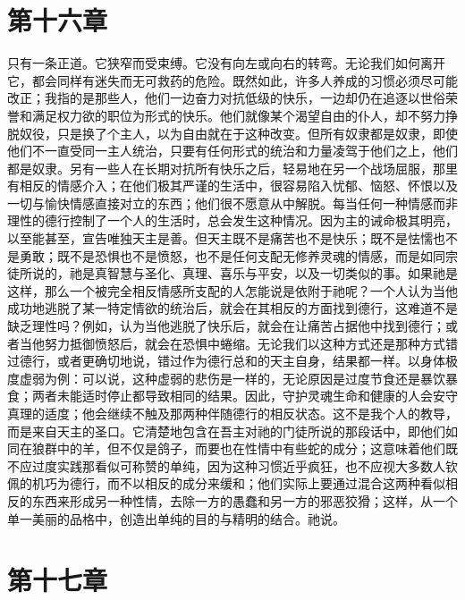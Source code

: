 
\section{第十六章}

只有一条正道。它狭窄而受束缚。它没有向左或向右的转弯。无论我们如何离开它，都会同样有迷失而无可救药的危险。既然如此，许多人养成的习惯必须尽可能改正；我指的是那些人，他们一边奋力对抗低级的快乐，一边却仍在追逐以世俗荣誉和满足权力欲的职位为形式的快乐。他们就像某个渴望自由的仆人，却不努力挣脱奴役，只是换了个主人，以为自由就在于这种改变。但所有奴隶都是奴隶，即使他们不一直受同一主人统治，只要有任何形式的统治和力量凌驾于他们之上，他们都是奴隶。另有一些人在长期对抗所有快乐之后，轻易地在另一个战场屈服，那里有相反的情感介入；在他们极其严谨的生活中，很容易陷入忧郁、恼怒、怀恨以及一切与愉快情感直接对立的东西；他们很不愿意从中解脱。每当任何一种情感而非理性的德行控制了一个人的生活时，总会发生这种情况。因为主的诫命极其明亮，以至能甚至，宣告唯独天主是善。但天主既不是痛苦也不是快乐；既不是怯懦也不是勇敢；既不是恐惧也不是愤怒，也不是任何支配无修养灵魂的情感，而是如同宗徒所说的，祂是真智慧与圣化、真理、喜乐与平安，以及一切类似的事。如果祂是这样，那么一个被完全相反情感所支配的人怎能说是依附于祂呢？一个人认为当他成功地逃脱了某一特定情欲的统治后，就会在其相反的方面找到德行，这难道不是缺乏理性吗？例如，认为当他逃脱了快乐后，就会在让痛苦占据他中找到德行；或者当他努力抵御愤怒后，就会在恐惧中蜷缩。无论我们以这种方式还是那种方式错过德行，或者更确切地说，错过作为德行总和的天主自身，结果都一样。以身体极度虚弱为例：可以说，这种虚弱的悲伤是一样的，无论原因是过度节食还是暴饮暴食；两者未能适时停止都导致相同的结果。因此，守护灵魂生命和健康的人会安守真理的适度；他会继续不触及那两种伴随德行的相反状态。这不是我个人的教导，而是来自天主的圣口。它清楚地包含在吾主对祂的门徒所说的那段话中，即他们如同在狼群中的羊，但不仅是鸽子，而要也在性情中有些蛇的成分；这意味着他们既不应过度实践那看似可称赞的单纯，因为这种习惯近乎疯狂，也不应视大多数人钦佩的机巧为德行，而不以相反的成分来缓和；他们实际上要通过混合这两种看似相反的东西来形成另一种性情，去除一方的愚蠢和另一方的邪恶狡猾；这样，从一个单一美丽的品格中，创造出单纯的目的与精明的结合。祂说。\par


\section{第十七章}

